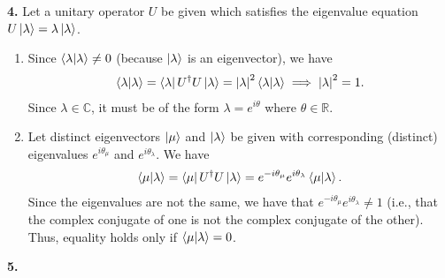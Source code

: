 \documentclass{article}
\theoremstyle{definition}
\begin{document}
\noindent \textbf{4.} Let a unitary operator $U$ be given which satisfies the eigenvalue equation $U\ket{\lambda} = \lambda\ket{\lambda}$.

\begin{enumerate}[label = (\alph*)]
	\item Since $\braket{\lambda} \neq 0$ (because $\ket{\lambda}$ is an eigenvector), we have
	\begin{align*}
	\braket{\lambda} = \bra{\lambda} U^\dagger U  \ket{\lambda } = \abs{\lambda}^2 \braket{\lambda} \implies  \abs{\lambda}^2 = 1.
	\end{align*}
	Since $\lambda\in \mathbb{C}$, it must be of the form $\lambda = e^{i\theta}$	where $\theta\in \mathbb{R}$. 
	
	
	\item Let distinct  eigenvectors $\ket{\mu}$ and $\ket{\lambda}$ be given with corresponding (distinct) eigenvalues $e^{i\theta_\mu}$ and $e^{i\theta_\lambda}$. We have
	\begin{align*}
	\bra{\mu}\ket{\lambda} = \bra{\mu} U^\dagger U \ket{\lambda} =  e^{-i\theta_\mu}e^{i\theta_\lambda}\bra{\mu}\ket{\lambda}.
	\end{align*}
	Since the eigenvalues are not the same, we have that $e^{-i\theta_\mu}e^{i\theta_\lambda} \neq 1$ (i.e., that the complex conjugate of one is not the complex conjugate of the other). Thus, equality holds only if $\bra{\mu}\ket{\lambda} = 0$. 
\end{enumerate}



\noindent \textbf{5.} 
\end{document}
